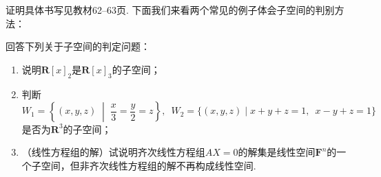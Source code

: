证明具体书写见教材62--63页. 下面我们来看两个常见的例子体会子空间的判别方法：
\begin{example}\label{ex:2:常见子空间}
    回答下列关于子空间的判定问题：
    \begin{enumerate}
        \item \label{item:2:常见子空间:1}
              说明$\mathbf{R}[x]_2$是$\mathbf{R}[x]_3$的子空间；

        \item \label{item:2:常见子空间:2}
              判断$W_1=\left\{(x,y,z) \;\middle|\; \dfrac{x}{3}=\dfrac{y}{2}=z\right\},\enspace W_2=\{(x,y,z) \mid x+y+z=1,\enspace x-y+z=1\}$是否为$\mathbf{R}^3$的子空间；

        \item \label{item:2:常见子空间:3}
              （线性方程组的解）试说明齐次线性方程组$AX=0$的解集是线性空间$\mathbf{F}^n$的一个子空间，但非齐次线性方程组的解不再构成线性空间.
    \end{enumerate}
\end{example}

